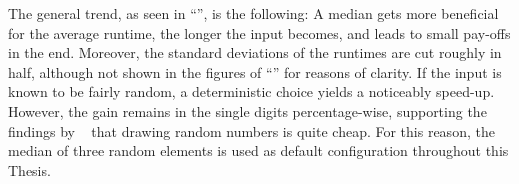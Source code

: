 The general trend, as seen in \enquote{}, is the following:
A median gets more beneficial for the average runtime, the longer the input becomes, and leads to small pay-offs in the end.
Moreover, the standard deviations of the runtimes are cut roughly in half, although not shown in the figures of \enquote{} for reasons of clarity.
If the input is known to be fairly random, a deterministic choice yields a noticeably speed-up.
However, the gain remains in the single digits percentage-wise, supporting the findings by \citeauthor{lukas_geis}~\cite{lukas_geis} that drawing random numbers is quite cheap.
For this reason, the median of three random elements is used as default configuration throughout this Thesis.




